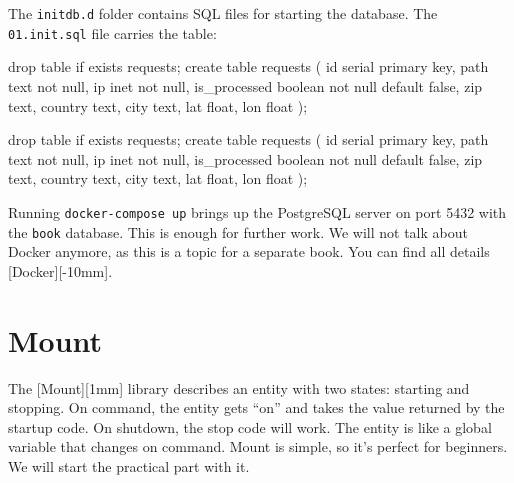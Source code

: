 \fi


The \verb|initdb.d| folder contains SQL files for starting the database. The \verb|01.init.sql| file carries the  table:


\ifnarrow

\begin{english}
  \begin{sql}
drop table if exists requests;
create table requests (
    id            serial primary key,
    path          text not null,
    ip            inet not null,
    is_processed  boolean not null
                  default false,
    zip           text,
    country       text,
    city          text,
    lat           float,
    lon           float
);
  \end{sql}
\end{english}

\else

\begin{english}
  \begin{sql}
drop table if exists requests;
create table requests (
    id            serial primary key,
    path          text not null,
    ip            inet not null,
    is_processed  boolean not null default false,
    zip           text,
    country       text,
    city          text,
    lat           float,
    lon           float
);
  \end{sql}
\end{english}

\fi

Running \verb|docker-compose up| brings up the PostgreSQL server on port 5432 with the \verb|book| database. This is enough for further work. We will not talk about Docker anymore, as this is a topic for a separate book. You can find all details [Docker][-10mm].

\section{Mount}


The [Mount][1mm] library describes an entity with two states: starting and stopping. On command, the entity gets ``on'' and takes the value returned by the startup code. On shutdown, the stop code will work. The entity is like a global variable that changes on command. Mount is simple, so it's perfect for beginners. We will start the practical part with it.

